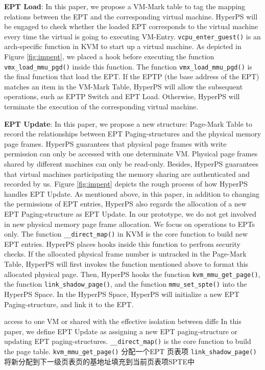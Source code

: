 \textbf{EPT Load}: 
In this paper, we propose a VM-Mark table to tag the mapping relations between the EPT and the corresponding virtual machine. 
HyperPS will be engaged to check whether the loaded EPT corresponds to the virtual machine every time the virtual is going to executing VM-Entry. 
\verb|vcpu_enter_guest()| is an arch-specific function in KVM to start up a virtual machine. 
As depicted in Figure \ref{fig:impept}, we placed a hook before executing the function \verb|vmx_load_mmu_pgd()| inside this function. The function \verb|vmx_load_mmu_pgd()| is the final function that load the EPT. 
If the EPTP (the base address of the EPT) matches an item in the VM-Mark Table, HyperPS will allow the subsequent operations, such as EPTP Switch and EPT Load. Otherwise, HyperPS will terminate the execution of the corresponding virtual machine. 

\textbf{EPT Update}: 
In this paper, we propose a new structure: Page-Mark Table to record the relationships between EPT Paging-structures and the physical memory page frames. 
HyperPS guarantees that physical page frames with write permission can only be accessed with one determinate VM. 
Physical page frames shared by different machines can only be read-only. 
Besides, HyperPS guarantees that virtual machines participating the memory sharing are authenticated and recorded by us. 
Figure \ref{fig:impept} depicts the rough process of how HyperPS handles EPT Update. 
As mentioned above, in this paper, in addition to changing the permissions of EPT entries, HyperPS also regards the allocation of a new EPT Paging-structure as EPT Update. 
In our prototype, we do not get involved in new physical memory page frame allocation. We focus on operations to EPTs only. 
The function \verb|__direct_map()| in KVM is the core function to build new EPT entries. HyperPS places hooks inside this function to perfrom security checks. If the allocated physical frame number is untracked in the Page-Mark Table, HyperPS will first invokes the function mentioned above to format this allocated physical page. Then, HyperPS hooks the function \verb|kvm_mmu_get_page()|, the function \verb|link_shadow_page()|, and the function \verb|mmu_set_spte()| into the HyperPS Space.
In the HyperPS Space, HyperPS will initialize a new EPT Paging-structure, and link it to the EPT.

\iffalse
access to one VM or shared with
the effective isolation between diffe
In this paper, we define EPT Update as assigning a new EPT paging-structure or updating EPT paging-structures. 
\verb|__direct_map()| is the core function to build the page table.
\verb|kvm_mmu_get_page()| 分配一个EPT 页表项 
\verb|link_shadow_page()| 将新分配到下一级页表页的基地址填充到当前页表项SPTE中


